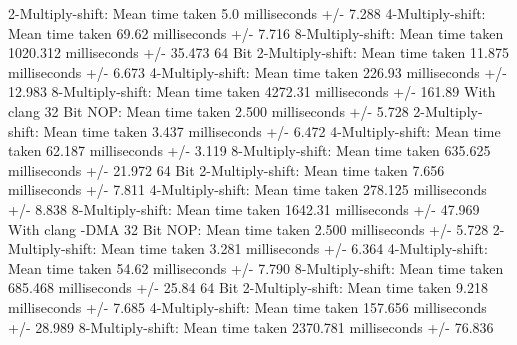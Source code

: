 2-Multiply-shift:       Mean time taken 5.0 milliseconds +/- 7.288
4-Multiply-shift:       Mean time taken 69.62 milliseconds +/- 7.716
8-Multiply-shift:       Mean time taken 1020.312 milliseconds +/- 35.473
64 Bit
2-Multiply-shift:       Mean time taken 11.875 milliseconds +/- 6.673
4-Multiply-shift:       Mean time taken 226.93 milliseconds +/- 12.983
8-Multiply-shift:       Mean time taken 4272.31 milliseconds +/- 161.89
With clang
32 Bit
NOP:    Mean time taken 2.500 milliseconds +/- 5.728
2-Multiply-shift:       Mean time taken 3.437 milliseconds +/- 6.472
4-Multiply-shift:       Mean time taken 62.187 milliseconds +/- 3.119
8-Multiply-shift:       Mean time taken 635.625 milliseconds +/- 21.972
64 Bit
2-Multiply-shift:       Mean time taken 7.656 milliseconds +/- 7.811
4-Multiply-shift:       Mean time taken 278.125 milliseconds +/- 8.838
8-Multiply-shift:       Mean time taken 1642.31 milliseconds +/- 47.969
With clang -DMA
32 Bit
NOP:    Mean time taken 2.500 milliseconds +/- 5.728
2-Multiply-shift:       Mean time taken 3.281 milliseconds +/- 6.364
4-Multiply-shift:       Mean time taken 54.62 milliseconds +/- 7.790
8-Multiply-shift:       Mean time taken 685.468 milliseconds +/- 25.84
64 Bit
2-Multiply-shift:       Mean time taken 9.218 milliseconds +/- 7.685
4-Multiply-shift:       Mean time taken 157.656 milliseconds +/- 28.989
8-Multiply-shift:       Mean time taken 2370.781 milliseconds +/- 76.836

